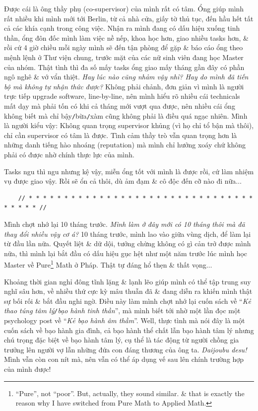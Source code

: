 \documentclass[12pt]{article}
\begin{document}
Được cái là ông thầy phụ (co-supervisor) của mình rất có tâm. Ổng giúp mình rất nhiều khi mình mới tới Berlin, từ cả nhà cửa, giấy tờ thủ tục, đến hầu hết tất cả các khía cạnh trong công việc. Nhận ra mình đang có dấu hiệu xuống tinh thần, ổng đôn đốc mình làm việc nề nếp, khoa học hơn, giao nhiều tasks hơn, \& rồi cứ 4 giờ chiều mỗi ngày mình sẽ đến tận phòng để gặp \& báo cáo ổng theo mệnh lệnh ở Thư viện chung, trước mặt của các nữ sinh viên đang học Master của nhóm. Thật tình thì đa số mấy tasks ổng giao mấy tháng gần đây có phần ngô nghê \& vớ vẩn thiệt. {\it Hay lúc nào cũng nhảm vậy nhỉ? Hay do mình đã tiến bộ mà không tự nhận thức được?} Không phải chảnh, đơn giản vì mình là người trực tiếp upgrade software, line-by-line, nên mình hiểu rõ nhiều cái technicals mất dạy mà phải tốn có khi cả tháng mới vượt qua được, nên nhiều cái ổng không biết mà chỉ bậy{\tt/}bừa{\tt/}xàm cũng không phải là điều quá ngạc nhiên. Mình là người kiểu vậy: Không quan trọng supervisor khủng (vì họ chỉ tổ bận mà thôi), chỉ cần supervisor có tâm là được. Tình cảm thầy trò vẫn quan trọng hơn là những danh tiếng hào nhoáng (reputation) mà mình chỉ hưởng xoáy chứ không phải có được nhờ chính thực lực của mình.

Tasks ngu thì ngu nhưng kệ vậy, miễn ổng tốt với mình là được rồi, cứ làm nhiệm vụ được giao vậy. Rồi sẽ ổn cả thôi, dù ảm đạm \& cô độc đến cỡ nào đi nữa$\ldots$

\begin{verbatim}
	// * * * * * * * * * * * * * * * * * * * * * * * * * * * * * * * * * * * * * //
\end{verbatim}

\noindent
{} Mình chợt nhớ lại 10 tháng trước. {\it Mình làm ở đây mới có 10 tháng thôi mà đã thay đổi nhiều vậy cơ á?} 10 tháng trước, mình lao vào giữa vùng dịch, để làm lại từ đầu lần nữa. Quyết liệt \& dữ dội, tưởng chừng không có gì cản trở được mình nữa, thì mình lại bắt đầu có dấu hiệu gục hệt như một năm trước lúc mình học Master về Pure\footnote{``Pure'', not ``poor''. But, actually, they sound similar. \& that is exactly the reason why I have switched from Pure Math to Applied Math.} Math ở Pháp. Thật tự đáng hổ thẹn \& thất vọng$\ldots$

Khoảng thời gian nghỉ đông tĩnh lặng \& lạnh lẽo giúp mình có thể tập trung suy nghĩ sâu hơn, về nhiều thứ cực kỳ mâu thuẫn đã \& đang diễn ra khiến mình thật sự bối rối \& bắt đầu nghi ngờ. Điều này làm mình chợt nhớ lại cuốn sách \cite{Bancroft_why_he_do,Bancroft_why_he_do_VN} về ``{\it Kẻ thao túng tâm lý{\tt/}bạo hành tinh thần}'', mà mình biết tới nhờ một lần đọc một psychology post về ``{\it Kẻ bạo hành âm thầm}''. Well, thực tình mà nói đây là một cuốn sách về bạo hành gia đình, cả bạo hành thể chất lẫn bạo hành tâm lý nhưng chú trọng đặc biệt về bạo hành tâm lý, cụ thể là tác động từ người chồng gia trưởng lên người vợ lẫn những đứa con đáng thương của ông ta. {\it Daijoubu desu!} Mình vẫn còn con nít mà, nên vẫn có thể áp dụng vế sau lên chính trường hợp của mình được!
\end{document}
